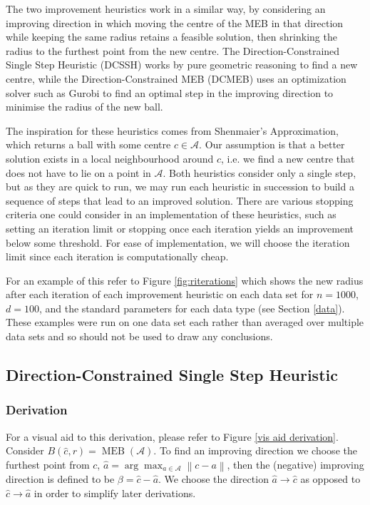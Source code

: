 \documentclass[11pt,twoside]{report}
\newcommand{\A}{\mathcal{A}} %
\newcommand{\norm}[1]{\left\lVert#1\right\rVert} %
\DeclareMathOperator{\MEB}{MEB}
\theoremstyle{definition}
\numberwithin{theorem}{section}
\numberwithin{definition}{section}
\numberwithin{lemma}{section}
\numberwithin{proposition}{section}
\numberwithin{equation}{section}
\numberwithin{figure}{section}
\begin{document}
The two improvement heuristics work in a similar way, by considering an improving direction in which moving the centre of the MEB in that direction while keeping the same radius retains a feasible solution, then shrinking the radius to the furthest point from the new centre. The Direction-Constrained Single Step Heuristic (DCSSH) works by pure geometric reasoning to find a new centre, while the Direction-Constrained MEB (DCMEB) uses an optimization solver such as Gurobi to find an optimal step in the improving direction to minimise the radius of the new ball.

The inspiration for these heuristics comes from Shenmaier's Approximation, which returns a ball with some centre $c\in\A$. Our assumption is that a better solution exists in a local neighbourhood around $c$, i.e. we find a new centre that does not have to lie on a point in $\A$. Both heuristics consider only a single step, but as they are quick to run, we may run each heuristic in succession to build a sequence of steps that lead to an improved solution. There are various stopping criteria one could consider in an implementation of these heuristics, such as setting an iteration limit or stopping once each iteration yields an improvement below some threshold. For ease of implementation, we will choose the iteration limit since each iteration is computationally cheap.

For an example of this refer to Figure \ref{fig:riterations} which shows the new radius after each iteration of each improvement heuristic on each data set for $n=1000$, $d=100$, and the standard parameters for each data type (see Section \ref{data}). These examples were run on one data set each rather than averaged over multiple data sets and so should not be used to draw any conclusions.

\subsection{Direction-Constrained Single Step Heuristic}
\subsubsection{Derivation}
For a visual aid to this derivation, please refer to Figure \ref{vis aid derivation}. Consider $B(\hat{c}, r) = \MEB(\A)$. To find an improving direction we choose the furthest point from $c$, $\hat{a}=\arg\max_{a\in\A}\norm{c-a}$, then the (negative) improving direction is defined to be $\beta=\hat{c}-\hat{a}$. We choose the direction $\hat{a}\to\hat{c}$ as opposed to $\hat{c}\to\hat{a}$ in order to simplify later derivations.
\end{document}
